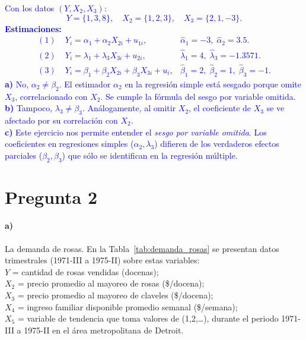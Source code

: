 \documentclass[10pt]{article}
\begin{document}
\textcolor{blue}{ 
    Con los datos \((Y, X_2, X_3)\):  
    \[
    Y=\{1,3,8\},\quad X_2=\{1,2,3\},\quad X_3=\{2,1,-3\}.
    \]
    \textbf{Estimaciones:}
    \begin{align*}
    (1)\;& Y_i=\alpha_1+\alpha_2X_{2i}+u_{1i}, & \hat{\alpha}_1=-3,\; \hat{\alpha}_2=3.5. \\
    (2)\;& Y_i=\lambda_1+\lambda_3X_{3i}+u_{2i}, & \hat{\lambda}_1=4,\; \hat{\lambda}_3=-1.3571. \\
    (3)\;& Y_i=\beta_1+\beta_2X_{2i}+\beta_3X_{3i}+u_i, & \hat{\beta}_1=2,\; \hat{\beta}_2=1,\; \hat{\beta}_3=-1.
    \end{align*}
    \textbf{a)} No, \(\alpha_2 \neq \beta_2\). El estimador \(\alpha_2\) en la regresión simple está sesgado porque omite \(X_3\), correlacionado con \(X_2\). Se cumple la fórmula del sesgo por variable omitida.\\
    \textbf{b)} Tampoco, \(\lambda_3 \neq \beta_3\). Análogamente, al omitir \(X_2\), el coeficiente de \(X_3\) se ve afectado por su correlación con \(X_2\).\\
    \textbf{c)} Este ejercicio nos permite entender el \textit{sesgo por variable omitida}. Los coeficientes en regresiones simples (\(\alpha_2,\lambda_3\)) difieren de los verdaderos efectos parciales (\(\beta_2,\beta_3\)) que sólo se identifican en la regresión múltiple.
    }
\newpage
\section{Pregunta 2}
\paragraph*{a)} La demanda de rosas. En la Tabla~\ref{tab:demanda_rosas} se presentan datos trimestrales (1971-III a 1975-II) sobre estas variables:\\
$Y$ = cantidad de rosas vendidas (docenas);\\
$X_2$ = precio promedio al mayoreo de rosas (\$/docena);\\
$X_3$ = precio promedio al mayoreo de claveles (\$/docena);\\
$X_4$ = ingreso familiar disponible promedio semanal (\$/semana);\\
$X_5$ = variable de tendencia que toma valores de (1,2,\dots), durante el periodo 1971-III a 1975-II en el área metropolitana de Detroit.\\
\end{document}
